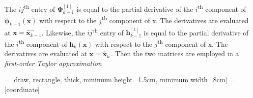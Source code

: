 \noindent
The $ij$\textsuperscript{th} entry of $\bm{\Phi}^{[1]}_{k-1}$ is equal to the partial derivative of the $i$\textsuperscript{th} component of $\bm{\phi}_{k-1}(\mathbf{x})$ with respect to the $j$\textsuperscript{th} component of x. The derivatives are evaluated at $\mathbf{x}=\hat{\mathbf{x}}^-_{k-1}$. Likewise, the $ij$\textsuperscript{th} entry of $\mathbf{h}^{[1]}_{k-1}$ is equal to the partial derivative of the $i$\textsuperscript{th} component of $\mathbf{h}_{k}(\mathbf{x})$ with respect to the $j$\textsuperscript{th} component of x. The derivatives are evaluated at $\mathbf{x}=\hat{\mathbf{x}}^-_{k}$. Then the two matrices are employed in a \emph{first-order Taylor approximation}





 = [draw, rectangle, thick, 
    minimum height=1.5cm, minimum width=8cm]
 = [coordinate]

